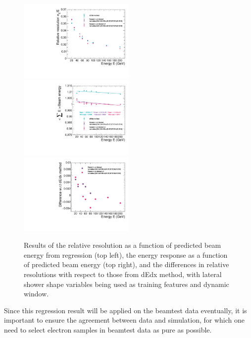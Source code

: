 \begin{figure}[!ht]
    \begin{center}  
    \includegraphics[width=0.5\textwidth]{Fig/fig_HGCAL/RelReso_comparison_dynamicwindow_showershape_v2}~
    \includegraphics[width=0.5\textwidth]{Fig/fig_HGCAL/Response_comparison_dynamicwindow_showershape_v2}\\
    \includegraphics[width=0.5\textwidth]{Fig/fig_HGCAL/Diff-wrt-dEdx-dynamicwindow_v2}\\
    \caption{Results of the relative resolution as a function of predicted beam energy from regression (top left), the energy response as a function of predicted beam energy (top right), and the differences in relative resolutions with respect to those from dEdx method, with lateral shower shape variables being used as training features and dynamic window.}
    \label{fig:energyreco-bdt-latest}
    \end{center}
\end{figure}

Since this regression result will be applied on the beamtest data eventually, it is important to ensure the agreement between data and simulation, for which one need to select electron samples in beamtest data as pure as possible.

